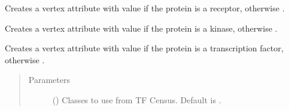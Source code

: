 \documentclass[letterpaper,10pt,english]{sphinxmanual}
\begin{document}
\begin{fulllineitems}
\begin{fulllineitems}
\end{fulllineitems}


\begin{fulllineitems}
\label{\detokenize{main:pypath.main.PyPath.set_receptors}}
Creates a vertex attribute  with value  if
the protein is a receptor, otherwise .

\end{fulllineitems}


\begin{fulllineitems}
\label{\detokenize{main:pypath.main.PyPath.set_signaling_proteins}}
Creates a vertex attribute  with value  if
the protein is a kinase, otherwise .

\end{fulllineitems}


\begin{fulllineitems}
\label{\detokenize{main:pypath.main.PyPath.set_tfs}}
\end{fulllineitems}


\begin{fulllineitems}
\label{\detokenize{main:pypath.main.PyPath.set_transcription_factors}}
Creates a vertex attribute  with value  if
the protein is a transcription factor, otherwise .
\begin{quote}\begin{description}
\item[{Parameters}] \leavevmode
{} () \textendash{} Classes to use from TF Census. Default is \sphinxtitleref{{[}‘a’, ‘b’, ‘other’{]}}.


\end{description}
\end{quote}
\end{fulllineitems}
\end{fulllineitems}
\end{document}
